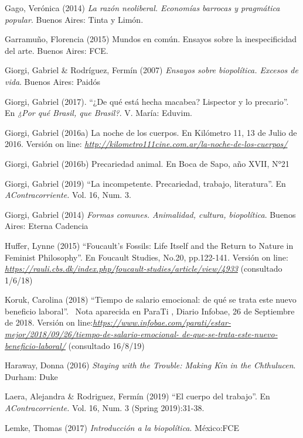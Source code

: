\documentclass[a4paper,]{scrartcl}
\begin{document}
Gago, Verónica (2014) \emph{La razón neoliberal. Economías barrocas y
pragmática popular}. Buenos Aires: Tinta y Limón.

Garramuño, Florencia (2015) Mundos en común. Ensayos sobre la
inespecificidad del arte. Buenos Aires: FCE.

Giorgi, Gabriel \& Rodríguez, Fermín (2007) \emph{Ensayos sobre
biopolítica. Excesos de vida}. Buenos Aires: Paidós

Giorgi, Gabriel (2017). ``¿De qué está hecha macabea? Lispector y lo
precario''. En \emph{¿Por qué Brasil, que Brasil?}. V. María: Eduvim.

Giorgi, Gabriel (2016a) La noche de los cuerpos. En Kilómetro 11, 13 de
Julio de 2016. Versión on line:
\href{http://kilometro111cine.com.ar/la-noche-de-los-cuerpos/}{\emph{http://kilometro111cine.com.ar/la-noche-de-los-cuerpos/}}

Giorgi, Gabriel (2016b) Precariedad animal. En Boca de Sapo, año XVII,
N°21

Giorgi, Gabriel (2019) ``La incompetente. Precariedad, trabajo,
literatura''. En \emph{AContracorriente.} Vol. 16, Num. 3.

Giorgi, Gabriel (2014) \emph{Formas comunes. Animalidad, cultura,
biopolítica}. Buenos Aires: Eterna Cadencia

Huffer, Lynne (2015) ``Foucault's Fossils: Life Itself and the Return to
Nature in Feminist Philosophy''. En Foucault Studies, No.20, pp.122-141.
Versión on line:
\href{https://rauli.cbs.dk/index.php/foucault-studies/article/view/4933}{\emph{https://rauli.cbs.dk/index.php/foucault-studies/article/view/4933}}
(consultado 1/6/18)

Koruk, Carolina (2018) ``Tiempo de salario emocional: de qué se trata
este nuevo beneficio laboral''.~ Nota aparecida en ParaTi , Diario
Infobae, 26 de Septiembre de 2018. Versión on
line:\href{https://www.infobae.com/parati/estar-mejor/2018/09/26/tiempo-de-salario-emocional-de-que-se-trata-este-nuevo-beneficio-laboral/}{\emph{https://www.infobae.com/parati/estar-mejor/2018/09/26/tiempo-de-salario-emocional-
de-que-se-trata-este-nuevo-beneficio-laboral/}} (consultado 16/8/19)

Haraway, Donna (2016) \emph{Staying with the Trouble: Making Kin in the
Chthulucen}. Durham: Duke

Laera, Alejandra \& Rodriguez, Fermín (2019) ``El cuerpo del trabajo''.
En \emph{AContracorriente.} Vol. 16, Num. 3 (Spring 2019):31-38.

Lemke, Thomas (2017) \emph{Introducción a la biopolítica}. México:FCE
\end{document}
